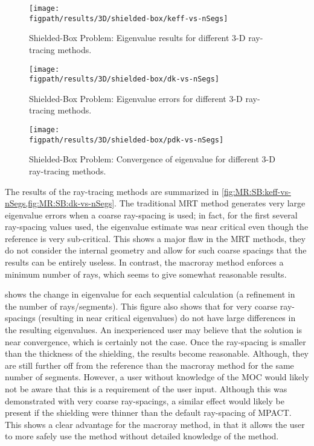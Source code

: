 {{{      \begin{figure}[hp]
        \centering
        \texttt{[image: \\figpath/results/3D/shielded-box/keff-vs-nSegs]}
        \caption{Shielded-Box Problem: Eigenvalue results for different 3-D ray-tracing methods. \label{fig:MR:SB:keff-vs-nSegs}}
      \end{figure}
      \begin{figure}[hp]
        \centering
        \texttt{[image: \\figpath/results/3D/shielded-box/dk-vs-nSegs]}
        \caption{Shielded-Box Problem: Eigenvalue errors for different 3-D ray-tracing methods. \label{fig:MR:SB:dk-vs-nSegs}}
      \end{figure}
      \begin{figure}[hp]
        \centering
        \texttt{[image: \\figpath/results/3D/shielded-box/pdk-vs-nSegs]}
        \caption{Shielded-Box Problem: Convergence of eigenvalue for different 3-D ray-tracing methods. \label{fig:MR:SB:pdk-vs-nSegs}}
      \end{figure}

      The results of the ray-tracing methods are summarized in \cref{fig:MR:SB:keff-vs-nSegs,fig:MR:SB:dk-vs-nSegs}.
      The traditional \ac{MRT} method generates very large eigenvalue errors when a coarse ray-spacing is used;
        in fact, for the first several ray-spacing values used, the eigenvalue estimate was near critical even though the reference is very sub-critical.
      This shows a major flaw in the \ac{MRT} methods, they do not consider the internal geometry and allow for such coarse spacings that the results can be entirely useless.
      In contrast, the macroray method enforces a minimum number of rays, which seems to give somewhat reasonable results.

       shows the change in eigenvalue for each sequential calculation (a refinement in the number of rays/segments).
      This figure also shows that for very coarse ray-spacings (resulting in near critical eigenvalues) do not have large differences in the resulting eigenvalues.
      An inexperienced user may believe that the solution is near convergence, which is certainly not the case.
      Once the ray-spacing is smaller than the thickness of the shielding, the results become reasonable.
      Although, they are still further off from the reference than the macroray method for the same number of segments.
      However, a user without knowledge of the \ac{MOC} would likely not be aware that this is a requirement of the user input.
      Although this was demonstrated with very coarse ray-spacings, a similar effect would likely be present if the shielding were thinner than the default ray-spacing of MPACT.
      This shows a clear advantage for the macroray method, in that it allows the user to more safely use the method without detailed knowledge of the method.
    }

}}
